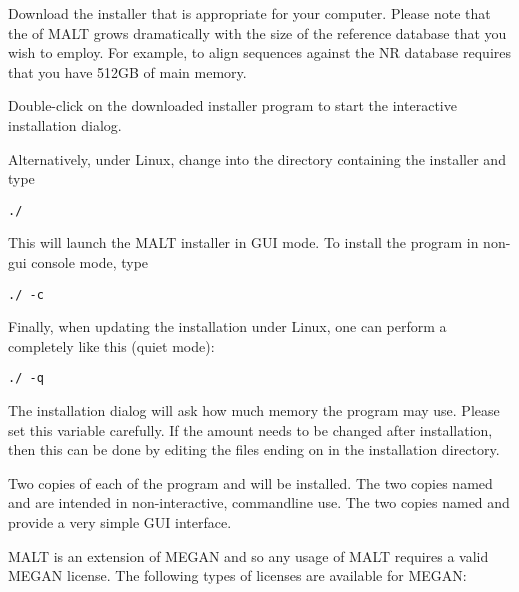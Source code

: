 \documentclass[11pt]{article}
\newcommand\MALT{{\sf MALT}\xspace}
\begin{document}
Download the installer that is appropriate for your computer. Please note that the 
of \MALT grows dramatically with the size of the reference database that you wish to employ.
For example, to align sequences against the NR database requires that you have 512GB of main memory.

Double-click on the downloaded installer program  to start the interactive installation dialog.

Alternatively, under Linux, change into the directory containing the installer and type

{\tt ./}

This will launch the \MALT installer in GUI mode. To install the program in non-gui console mode,
type

{\tt ./ -c}

Finally, when updating the installation under Linux, one can perform a completely
 like this (quiet mode):

{\tt ./ -q}

The installation dialog will ask how much memory the program may use. Please set this variable carefully.
If the amount needs to be changed after installation, then this can be done by editing the files
ending on  in the installation directory.

Two copies of each of the program  and  will be installed.
The two copies named  and  are intended in non-interactive, commandline use.
The two copies  named  and  provide a very simple GUI interface.



\MALT is an extension of MEGAN and so
any usage of \MALT requires a valid MEGAN license. The following types of licenses are available for MEGAN:
\end{document}
